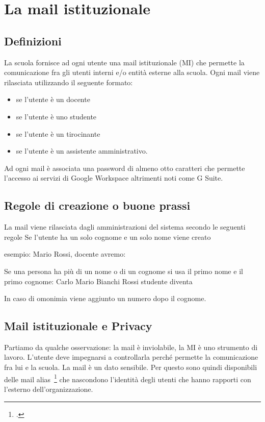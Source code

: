 \chapter{La mail istituzionale}
\printpartialtoc
\section{Definizioni}
La scuola fornisce ad ogni utente una mail istituzionale (MI) che permette 
la comunicazione fra gli utenti interni e/o entità esterne alla scuola.
Ogni mail viene rilasciata utilizzando il seguente formato:
\begin{itemize}
	\item {} se l'utente è un docente
	\item {} se l'utente è uno studente
	\item {} se l'utente è un 
	tirocinante
	\item {} se l'utente è un 
	assistente 
	amministrativo.
\end{itemize}

Ad ogni mail è associata una password di almeno otto caratteri che permette 
l'accesso ai servizi di Google Workspace altrimenti noti come G Suite.

\section{Regole di creazione o buone prassi} 
La mail viene rilasciata dagli amministrazioni del sistema secondo le seguenti 
regole
Se l'utente ha un solo cognome e un solo nome viene creato
\begin{center}
\end{center}
esempio: Mario Rossi, docente avremo:
\begin{center}
\end{center}
Se una persona ha più di un nome o di un cognome si usa il primo nome e il  
primo cognome: Carlo Mario Bianchi Rossi studente diventa
\begin{center}
\end{center}
In caso di omonimia viene aggiunto un numero dopo il cognome.
\section{Mail istituzionale e Privacy}
Partiamo da qualche osservazione: la mail è inviolabile, la 
MI è uno strumento di lavoro. L'utente deve impegnarsi a controllarla perché permette la comunicazione fra lui e la scuola. La mail è 
un dato sensibile. Per questo sono quindi 
disponibili delle mail alias~\footcite{Garante2007} che nascondono l'identità degli utenti 
che  hanno rapporti 
con l'esterno dell'organizzazione. 

